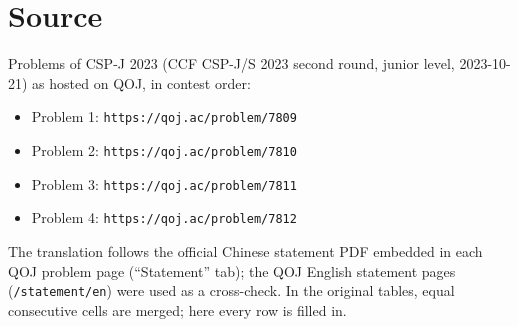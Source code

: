 \documentclass[11pt]{article}
\begin{document}
\section*{Source}

Problems of CSP-J 2023 (CCF CSP-J/S 2023 second round, junior level,
2023-10-21) as hosted on QOJ, in contest order:
\begin{itemize}
\item Problem 1: \texttt{https://qoj.ac/problem/7809}
\item Problem 2: \texttt{https://qoj.ac/problem/7810}
\item Problem 3: \texttt{https://qoj.ac/problem/7811}
\item Problem 4: \texttt{https://qoj.ac/problem/7812}
\end{itemize}
The translation follows the official Chinese statement PDF embedded in each
QOJ problem page (``Statement'' tab);
the QOJ English statement pages (\texttt{/statement/en}) were used as a
cross-check.
In the original tables, equal consecutive cells are merged;
here every row is filled in.
\end{document}
